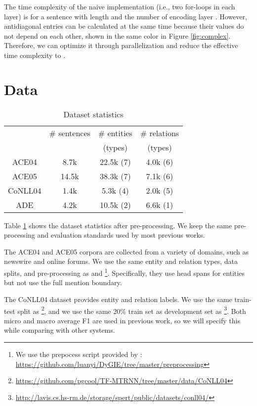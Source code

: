 \documentclass[11pt,a4paper]{article}
\begin{document}
The time complexity of the naive implementation (i.e., two for-loops in each layer) is  for a sentence with length  and the number of encoding layer .
However, antidiagonal entries can be calculated at the same time because their values do not depend on each other, shown in the same color in Figure \ref{fig:complex}.
Therefore, we can optimize it through parallelization and reduce the effective time complexity to .

\section{Data} \label{sec:data}

\begin{table}[]
\centering
\scalebox{0.82}
{
\begin{tabular}{cccc}
    \toprule
            & \# sentences & \# entities  & \# relations     \\&              & (types)      & (types)         \\\midrule
    ACE04   & 8.7k    & 22.5k (7)    & 4.0k (6)          \\ACE05   & 14.5k   & 38.3k (7)    & 7.1k (6)          \\CoNLL04 & 1.4k    & 5.3k (4)     & 2.0k (5)          \\ADE     & 4.2k    & 10.5k (2)    & 6.6k (1)          \\\bottomrule
\end{tabular}
}
\caption{Dataset statistics}
\label{tab:data}
\end{table}

Table \ref{tab:data} shows the dataset statistics after pre-processing.
We keep the same pre-processing and evaluation standards used by most previous works.

The ACE04 and ACE05 corpora are collected from a variety of domains, such as newswire and online forums.
We use the same entity and relation types, data splits,
and pre-processing as \citet{li2014incremental} and \citet{miwa2016end}\footnote{
We use the prepocess script provided by \citet{luan2019general}:
\url{https://github.com/luanyi/DyGIE/tree/master/preprocessing}}.
Specifically, they use head spans for entities but not use the full mention boundary.

The CoNLL04 dataset provides entity and relation labels.
We use the same train-test split as \citet{gupta2016table}\footnote{
\url{https://github.com/pgcool/TF-MTRNN/tree/master/data/CoNLL04}},
and we use the same 20\% train set as development set as \citet{eberts2019span}\footnote{
\url{http://lavis.cs.hs-rm.de/storage/spert/public/datasets/conll04/}}.
Both micro and macro average F1 are used in previous work, so we will specify this while comparing with other systems.
\end{document}
